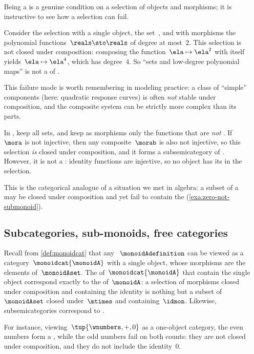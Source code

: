 Being a  is a genuine condition on a selection of objects and morphisms; it is instructive to see how a selection can fail.

\begin{example}
    \label{exa:quadratics-closure-fails}
    Consider the selection with a single object, the set~\reals, and with morphisms the polynomial functions~$\reals \sto \reals$ of degree at most~$2$.
    This selection is not closed under composition: composing the function~$\ela \mapsto \ela^2$ with itself yields~$\ela \mapsto \ela^4$, which has degree~$4$.
    So ``sets and low-degree polynomial maps'' is not a  of \Set.

    This failure mode is worth remembering in modeling practice: a class of ``simple'' components (here: quadratic response curves) is often \emph{not} stable under composition, and the composite system can be strictly more complex than its parts.
\end{example}

\begin{example}
    \label{exa:noninjective-subsemicategory}
    In \Set, keep all sets, and keep as morphisms only the functions that are \emph{not} .
    If~$\mora$ is not injective, then any composite~$\morab$ is also not injective, so this selection \emph{is} closed under composition, and it forms a subsemicategory of \Set.
    However, it is not a : identity functions are injective, so no object has its  in the selection.

    This is the categorical analogue of a situation we met in algebra: a subset of a  may be closed under composition and yet fail to contain the  (\cref{exa:zero-not-submonoid}).
\end{example}

\subsection{Subcategories, sub-monoids, free categories}

\begin{example}
    \label{exa:subcats-of-monoid-cat}
    Recall from \cref{def:monoidcat} that any ~$\monoidAdefinition$ can be viewed as a category~$\monoidcat{\monoidA}$ with a single object, whose morphisms are the elements of~$\monoidAset$.
    The  of~$\monoidcat{\monoidA}$ that contain the single object correspond exactly to the  of~$\monoidA$: a selection of morphisms closed under composition and containing the identity is nothing but a subset of~$\monoidAset$ closed under~$\mtimes$ and containing~$\idmon$.
    Likewise, subsemicategories correspond to .

    For instance, viewing~$\tup{\wnumbers, +, 0}$ as a one-object category, the even numbers form a , while the odd numbers fail on both counts: they are not closed under composition, and they do not include the identity~$0$.
\end{example}

